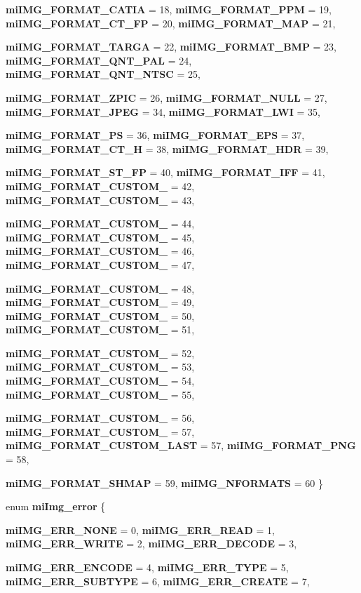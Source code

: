\begin{CompactItemize}
\par
{\bf mi\-IMG\_\-FORMAT\_\-CATIA} =  18, 
{\bf mi\-IMG\_\-FORMAT\_\-PPM} =  19, 
{\bf mi\-IMG\_\-FORMAT\_\-CT\_\-FP} =  20, 
{\bf mi\-IMG\_\-FORMAT\_\-MAP} =  21, 
\par
{\bf mi\-IMG\_\-FORMAT\_\-TARGA} =  22, 
{\bf mi\-IMG\_\-FORMAT\_\-BMP} =  23, 
{\bf mi\-IMG\_\-FORMAT\_\-QNT\_\-PAL} =  24, 
{\bf mi\-IMG\_\-FORMAT\_\-QNT\_\-NTSC} =  25, 
\par
{\bf mi\-IMG\_\-FORMAT\_\-ZPIC} =  26, 
{\bf mi\-IMG\_\-FORMAT\_\-NULL} =  27, 
{\bf mi\-IMG\_\-FORMAT\_\-JPEG} =  34, 
{\bf mi\-IMG\_\-FORMAT\_\-LWI} =  35, 
\par
{\bf mi\-IMG\_\-FORMAT\_\-PS} =  36, 
{\bf mi\-IMG\_\-FORMAT\_\-EPS} =  37, 
{\bf mi\-IMG\_\-FORMAT\_\-CT\_\-H} =  38, 
{\bf mi\-IMG\_\-FORMAT\_\-HDR} =  39, 
\par
{\bf mi\-IMG\_\-FORMAT\_\-ST\_\-FP} =  40, 
{\bf mi\-IMG\_\-FORMAT\_\-IFF} =  41, 
{\bf mi\-IMG\_\-FORMAT\_\-CUSTOM\_} =  42, 
{\bf mi\-IMG\_\-FORMAT\_\-CUSTOM\_} =  43, 
\par
{\bf mi\-IMG\_\-FORMAT\_\-CUSTOM\_} =  44, 
{\bf mi\-IMG\_\-FORMAT\_\-CUSTOM\_} =  45, 
{\bf mi\-IMG\_\-FORMAT\_\-CUSTOM\_} =  46, 
{\bf mi\-IMG\_\-FORMAT\_\-CUSTOM\_} =  47, 
\par
{\bf mi\-IMG\_\-FORMAT\_\-CUSTOM\_} =  48, 
{\bf mi\-IMG\_\-FORMAT\_\-CUSTOM\_} =  49, 
{\bf mi\-IMG\_\-FORMAT\_\-CUSTOM\_} =  50, 
{\bf mi\-IMG\_\-FORMAT\_\-CUSTOM\_} =  51, 
\par
{\bf mi\-IMG\_\-FORMAT\_\-CUSTOM\_} =  52, 
{\bf mi\-IMG\_\-FORMAT\_\-CUSTOM\_} =  53, 
{\bf mi\-IMG\_\-FORMAT\_\-CUSTOM\_} =  54, 
{\bf mi\-IMG\_\-FORMAT\_\-CUSTOM\_} =  55, 
\par
{\bf mi\-IMG\_\-FORMAT\_\-CUSTOM\_} =  56, 
{\bf mi\-IMG\_\-FORMAT\_\-CUSTOM\_} =  57, 
{\bf mi\-IMG\_\-FORMAT\_\-CUSTOM\_\-LAST} =  57, 
{\bf mi\-IMG\_\-FORMAT\_\-PNG} =  58, 
\par
{\bf mi\-IMG\_\-FORMAT\_\-SHMAP} =  59, 
{\bf mi\-IMG\_\-NFORMATS} =  60
 \}
\item 
enum {\bf mi\-Img\_\-error} \{ \par
{\bf mi\-IMG\_\-ERR\_\-NONE} =  0, 
{\bf mi\-IMG\_\-ERR\_\-READ} =  1, 
{\bf mi\-IMG\_\-ERR\_\-WRITE} =  2, 
{\bf mi\-IMG\_\-ERR\_\-DECODE} =  3, 
\par
{\bf mi\-IMG\_\-ERR\_\-ENCODE} =  4, 
{\bf mi\-IMG\_\-ERR\_\-TYPE} =  5, 
{\bf mi\-IMG\_\-ERR\_\-SUBTYPE} =  6, 
{\bf mi\-IMG\_\-ERR\_\-CREATE} =  7, 
\par

\end{CompactItemize}
